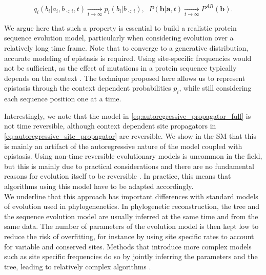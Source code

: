 \begin{equation}
	\label{eq:autoregressive_long_term}
	q_i(b_i \vert a_i, b_{<i}, t) \xrightarrow[t \rightarrow \infty]{} p_i(b_i \vert b_{<i}), 
	\;\; P(\mathbf{b} \vert \mathbf{a}, t) \xrightarrow[t \rightarrow \infty]{} P^{AR}(\mathbf{b}).
\end{equation}

We argue here that such a property is essential to build a realistic protein sequence evolution model, particularly when considering evolution over a relatively long time frame. 
Note that to converge to a generative distribution, accurate modeling of epistasis is required. 
Using site-specific frequencies would not be sufficient, as the effect of mutations in a protein sequence typically depends on the context \cite{socolich_evolutionaryinformationspecifying_2005}. 
The technique proposed here allows us to represent epistasis through the context dependent probabilities $p_i$, while still considering each sequence position one at a time. 

Interestingly, we note that the model in \eqref{eq:autoregressive_propagator_full} is not time reversible, although context dependent site propagators in \eqref{eq:autoregressive_site_propagator} are reversible. 
We show in the SM that this is mainly an artifact of the autoregressive nature of the model coupled with epistasis. 
Using non-time reversible evolutionary models is uncommon in the field, but this is mainly due to practical considerations and there are no fundamental reasons for evolution itself to be reversible \cite{felsensteinjoseph_inferringphylogenies_2003}. 
In practice, this means that algorithms using this model have to be adapted accordingly. \\


We underline that this approach has important differences with standard models of evolution used in phylogenenetics. 
In phylogenetic reconstruction, the tree and the sequence evolution model are usually inferred at the same time and from the same data. 
The number of parameters of the evolution model is then kept low to reduce the risk of overfitting, for instance by using site specific rates to account for variable and conserved sites. 
Methods that introduce more complex models such as site specific frequencies do so by jointly inferring the parameters and the tree, leading to relatively complex algorithms \cite{halpern_evolutionarydistancesproteincoding_1998a,puller_efficientinferencepotential_2020}.

